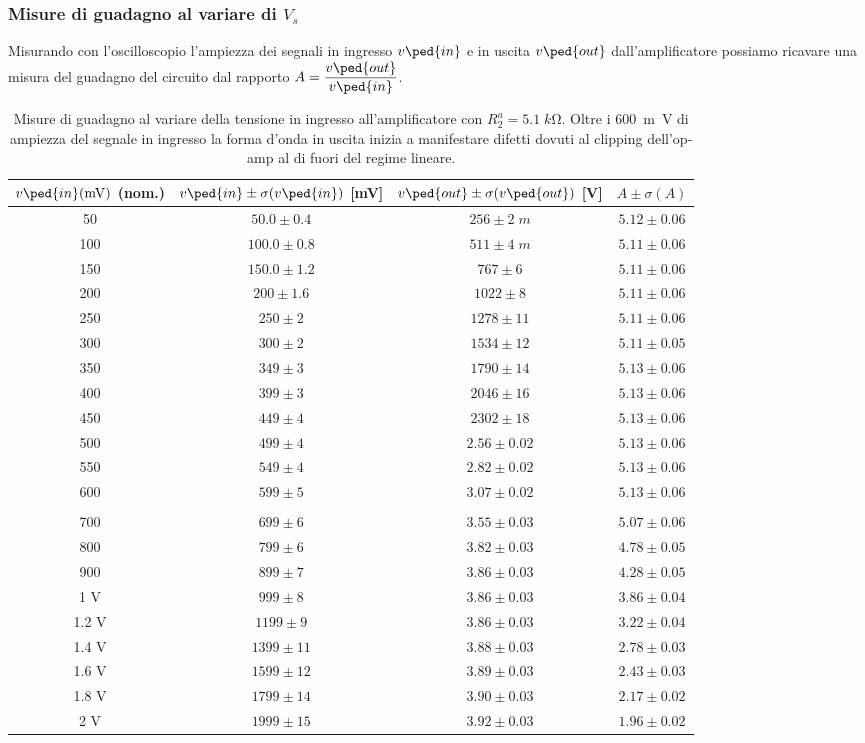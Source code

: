 \documentclass[10pt, a4paper, italian]{article}
\begin{document}
\subsubsection{Misure di guadagno al variare di $V_s$}
Misurando con l'oscilloscopio l'ampiezza dei segnali in ingresso $v\ped{in}$
e in uscita $v\ped{out}$ dall'amplificatore possiamo ricavare una misura del
guadagno del circuito dal rapporto $A = \dfrac{v\ped{out}}{v\ped{in}}$.
\begin{table}[htbp]
\centering
\begin{tabular}{cccc}
\toprule
$v\ped{in}(\si{m\V})$ (nom.) & $v\ped{in} \pm \sigma(v\ped{in})$ [mV] & $v\ped{out} \pm \sigma(v\ped{out})$ [V] & $A \pm \sigma(A)$ \\
\midrule
\midrule
50 & $50.0 \pm 0.4$ & $256 \pm 2 \; \si{m}$ & $5.12 \pm 0.06$ \\
100 & $100.0 \pm 0.8$ & $511 \pm 4 \; \si{m}$ & $5.11 \pm 0.06$ \\
150 & $150.0 \pm 1.2$ & $767 \pm 6$ & $5.11 \pm 0.06$ \\
200 & $200 \pm 1.6$ & $1022 \pm 8$ & $5.11 \pm 0.06$ \\
250 & $250 \pm 2$ & $1278 \pm 11$ & $5.11 \pm 0.06$ \\
300 & $300 \pm 2$ & $1534 \pm 12$ & $5.11 \pm 0.05$ \\
350 & $349 \pm 3$ & $1790 \pm 14$ & $5.13 \pm 0.06$ \\
400 & $399 \pm 3$ & $2046 \pm 16$ & $5.13 \pm 0.06$ \\
450 & $449 \pm 4$ & $2302 \pm 18$ & $5.13 \pm 0.06$ \\
500 & $499 \pm 4$ & $2.56 \pm 0.02$ & $5.13 \pm 0.06$ \\
550 & $549 \pm 4$ & $2.82 \pm 0.02$ & $5.13 \pm 0.06$ \\
600 & $599 \pm 5$ & $3.07 \pm 0.02$ & $5.13 \pm 0.06$ \\
\\
700 & $699 \pm 6$ & $3.55 \pm 0.03$ & $5.07 \pm 0.06$ \\
800 & $799 \pm 6$ & $3.82 \pm 0.03$ & $4.78 \pm 0.05$ \\
900 & $899 \pm 7$ & $3.86 \pm 0.03$ & $4.28 \pm 0.05$ \\
1 V & $999 \pm 8$ & $3.86 \pm 0.03$ & $3.86 \pm 0.04$ \\
1.2 V & $1199 \pm 9$ & $3.86 \pm 0.03$ & $3.22 \pm 0.04$ \\
1.4 V & $1399 \pm 11$ & $3.88 \pm 0.03$ & $2.78 \pm 0.03$ \\
1.6 V & $1599 \pm 12$ & $3.89 \pm 0.03$ & $2.43 \pm 0.03$ \\
1.8 V & $1799 \pm 14$ & $3.90 \pm 0.03$ & $2.17 \pm 0.02$ \\
2 V & $1999 \pm 15$ & $3.92 \pm 0.03$ & $1.96 \pm 0.02$ \\
\bottomrule
\end{tabular} 
\caption{Misure di guadagno al variare della tensione in ingresso
all'amplificatore con $R_2^a = 5.1 \; \si{k\ohm}$. Oltre i \SI{600}{m\V} di
ampiezza del segnale in ingresso la forma d'onda in uscita inizia a
manifestare difetti dovuti al clipping dell'op-amp al di fuori del regime
lineare. \label{tab: gain}}
\end{table}
\end{document}

